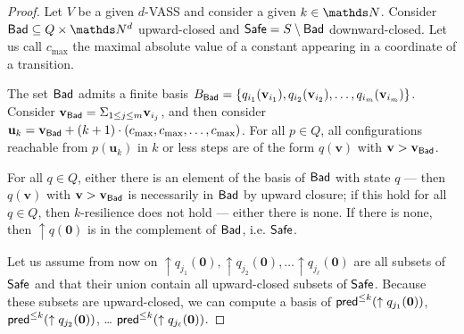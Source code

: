 \begin{proof}
Let $V$ be a given $d$-VASS and consider a given $k \in \N$.
Consider $\Bad \subseteq Q \times \N^d$ upward-closed and 
$\textsf{Safe} = S \setminus \textsf{Bad}$
 downward-closed.
Let us call $c_{\max}$ the maximal absolute value of a constant appearing in a coordinate of a transition.

The set $\textsf{Bad}$ admits a finite basis 
$B_{\textsf{Bad}} = \{ q_{i_1}(\textbf{v}_{i_1}), q_{i_2}(\textbf{v}_{i_2}), \ldots,
q_{i_m}(\textbf{v}_{i_m}) \}$.
Consider $\textbf{v}_{\textsf{Bad}} = \Sigma_{1 \leq j \leq m} \textbf{v}_{i_j}$,
and then consider 
$\textbf{u}_k = \textbf{v}_{\textsf{Bad}} + (k+1) \cdot (c_{\max}, c_{\max}, \ldots, c_{\max})$.
For all $p \in Q$, all configurations reachable from $p(\textbf{u}_k)$ in $k$ or less steps are 
of the form $q(\textbf{v})$ with $ \textbf{v} > \textbf{v}_{\textsf{Bad}}$.

For all $q \in Q$, either there is an element of the basis of $\textsf{Bad}$ with state $q$ \----
then $q(\textbf{v})$ with $\textbf{v} > \textbf{v}_{\textsf{Bad}}$ is necessarily in $\textsf{Bad}$ by upward closure; if this hold for all $q \in Q$, then $k$-resilience does not hold \---- either there is none. If there is none, then 
$\uparrow q(\textbf{0})$
 is in the complement of $\textsf{Bad}$, i.e. $\textsf{Safe}$.

Let us assume from now on 
 $\uparrow q_{j_1}(\textbf{0}), \uparrow q_{j_2}(\textbf{0}), \ldots \uparrow q_{j_\ell}(\textbf{0})$ are
all subsets of $\textsf{Safe}$ and that their union contain all upward-closed subsets of $\textsf{Safe}$.
Because these subsets are upward-closed, we can compute a basis of
$\textsf{pred}^{\leq k}(\uparrow q_{j_1}(\textbf{0}))$, $\textsf{pred}^{\leq k}(\uparrow q_{j_2}(\textbf{0}))$, \ldots
$\textsf{pred}^{\leq k}(\uparrow q_{j_\ell}(\textbf{0}))$.



\end{proof}
